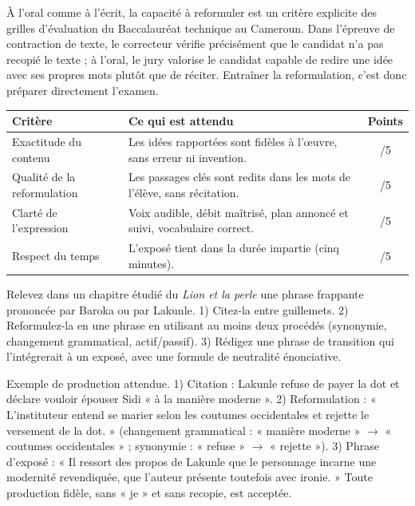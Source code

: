 \documentclass[11pt]{article}
\newcounter{popsec}
\newcounter{popsub}
\newcommand{\courssub}[1]{%
  \stepcounter{popsub}%
  \par\vspace{9pt}\noindent{\popxbold\fontsize{11.5}{13}\selectfont\color{popink}{\color{poporange}\thepopsec.\thepopsub}\hspace{6pt}#1}\par\nopagebreak\vspace{4pt}
}
\begin{document}
\begin{savaistu}
À l'oral comme à l'écrit, la capacité à reformuler est un critère explicite des grilles d'évaluation du Baccalauréat technique au Cameroun. Dans l'épreuve de contraction de texte, le correcteur vérifie précisément que le candidat n'a pas recopié le texte ; à l'oral, le jury valorise le candidat capable de redire une idée avec ses propres mots plutôt que de réciter. Entraîner la reformulation, c'est donc préparer directement l'examen.
\end{savaistu}

\courssub{Grille d'évaluation des exposés}

\begin{center}
\begin{tabularx}{\linewidth}{|l|X|c|}
\hline
\rowcolor{popblueL} \textbf{Critère} & \textbf{Ce qui est attendu} & \textbf{Points} \\
\hline
Exactitude du contenu & Les idées rapportées sont fidèles à l'œuvre, sans erreur ni invention. & /5 \\
\hline
Qualité de la reformulation & Les passages clés sont redits dans les mots de l'élève, sans récitation. & /5 \\
\hline
Clarté de l'expression & Voix audible, débit maîtrisé, plan annoncé et suivi, vocabulaire correct. & /5 \\
\hline
Respect du temps & L'exposé tient dans la durée impartie (cinq minutes). & /5 \\
\hline
\end{tabularx}
\end{center}

\begin{exercice}
Relevez dans un chapitre étudié du \emph{Lion et la perle} une phrase frappante prononcée par Baroka ou par Lakunle. 1) Citez-la entre guillemets. 2) Reformulez-la en une phrase en utilisant au moins deux procédés (synonymie, changement grammatical, actif/passif). 3) Rédigez une phrase de transition qui l'intégrerait à un exposé, avec une formule de neutralité énonciative.
\end{exercice}

\begin{corrige}[Exercice 1]
Exemple de production attendue. 1) Citation : Lakunle refuse de payer la dot et déclare vouloir épouser Sidi « à la manière moderne ». 2) Reformulation : « L'instituteur entend se marier selon les coutumes occidentales et rejette le versement de la dot. » (changement grammatical : « manière moderne » $\rightarrow$ « coutumes occidentales » ; synonymie : « refuse » $\rightarrow$ « rejette »). 3) Phrase d'exposé : « Il ressort des propos de Lakunle que le personnage incarne une modernité revendiquée, que l'auteur présente toutefois avec ironie. » Toute production fidèle, sans « je » et sans recopie, est acceptée.
\end{corrige}
\end{document}
